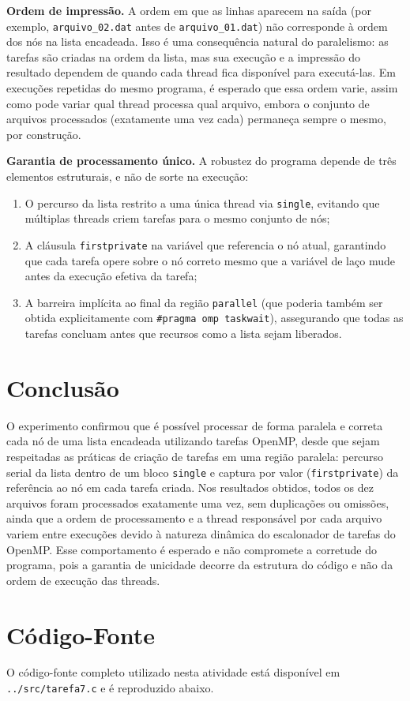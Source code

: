 \documentclass[a4paper,12pt]{article}
\begin{document}
\textbf{Ordem de impressão.} A ordem em que as linhas aparecem na saída (por exemplo, \texttt{arquivo\_02.dat} antes de \texttt{arquivo\_01.dat}) não corresponde à ordem dos nós na lista encadeada. 
Isso é uma consequência natural do paralelismo: as tarefas são criadas na ordem da lista, mas sua execução e a impressão do resultado dependem de quando cada thread fica disponível para executá-las. 
Em execuções repetidas do mesmo programa, é esperado que essa ordem varie, assim como pode variar qual thread processa qual arquivo, embora o conjunto de arquivos processados (exatamente uma vez cada) permaneça sempre o mesmo, por construção.

\textbf{Garantia de processamento único.} A robustez do programa depende de três elementos estruturais, e não de sorte na execução: 

\begin{enumerate}
    \item O percurso da lista restrito a uma única thread via \texttt{single}, evitando que múltiplas threads criem tarefas para o mesmo conjunto de nós;
    \item A cláusula \texttt{firstprivate} na variável que referencia o nó atual, garantindo que cada tarefa opere sobre o nó correto mesmo que a variável de laço mude antes da execução efetiva da tarefa;
    \item A barreira implícita ao final da região \texttt{parallel} (que poderia também ser obtida explicitamente com \texttt{\#pragma omp taskwait}), assegurando que todas as tarefas concluam antes que recursos como a lista sejam liberados.
\end{enumerate}

\section{Conclusão}

O experimento confirmou que é possível processar de forma paralela e correta cada nó de uma lista encadeada utilizando tarefas OpenMP, desde que sejam respeitadas as práticas de criação de tarefas em uma região paralela: percurso serial da lista dentro de um bloco \texttt{single} e captura por valor (\texttt{firstprivate}) da referência ao nó em cada tarefa criada. Nos resultados obtidos, todos os dez arquivos foram processados exatamente uma vez, sem duplicações ou omissões, ainda que a ordem de processamento e a thread responsável por cada arquivo variem entre execuções devido à natureza dinâmica do escalonador de tarefas do OpenMP. Esse comportamento é esperado e não compromete a corretude do programa, pois a garantia de unicidade decorre da estrutura do código e não da ordem de execução das threads.

\newpage
\appendix

\section{Código-Fonte}
\label{sec:codigo}

O código-fonte completo utilizado nesta atividade está disponível em \texttt{../src/tarefa7.c} e é reproduzido abaixo.


\end{document}
